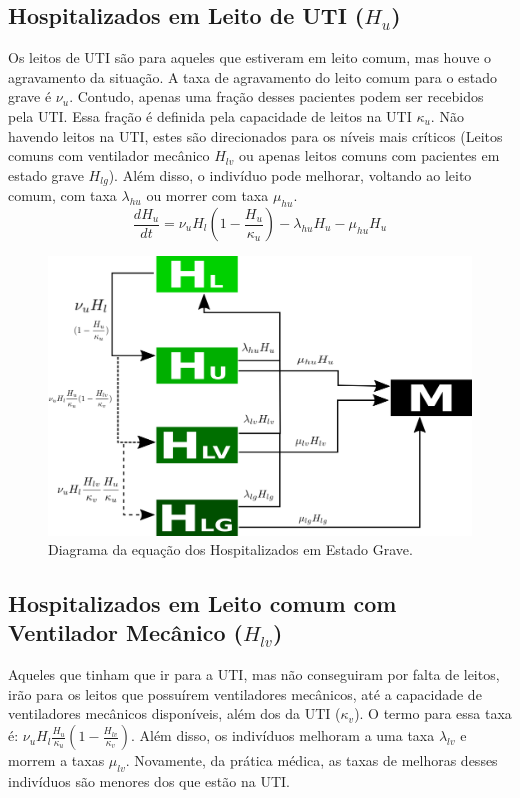 \documentclass[12pt,letterpaper]{article}
\begin{document}
\subsection{Hospitalizados em Leito de UTI ($H_u$)}
Os leitos de UTI são para aqueles que estiveram em leito comum, mas houve o agravamento da situação. A taxa de agravamento do leito comum para o estado grave é $\nu_u$. Contudo, apenas uma fração desses pacientes podem ser recebidos pela UTI. Essa fração é definida pela capacidade de leitos na UTI $\kappa_u$. Não havendo leitos na UTI, estes são direcionados para os níveis mais críticos (Leitos comuns com ventilador mecânico $H_{lv}$ ou apenas leitos comuns com pacientes em estado grave $H_{lg}$). Além disso, o indivíduo pode melhorar, voltando ao leito comum, com taxa $\lambda_{hu}$ ou morrer com taxa $\mu_{hu}$.
\begin{equation}
	\frac{dH_u}{dt}=\nu_u H_l(1 - \frac{H_u}{\kappa_{u}}) -\lambda_{hu} H_u -\mu_{hu} H_u
\end{equation}
\begin{figure}[!h]
	\centering
	\includegraphics[scale=0.4]{covidHu}
	\caption{Diagrama da equação dos Hospitalizados em Estado Grave.}
	\label{fig:universe}
\end{figure}


\subsection{Hospitalizados em Leito comum com Ventilador Mecânico ($H_{lv}$)}
Aqueles que tinham que ir para a UTI, mas não conseguiram por falta de leitos, irão para os leitos que possuírem ventiladores mecânicos, até a capacidade de ventiladores mecânicos disponíveis, além dos da UTI ($\kappa_v$). O termo para essa taxa é: $\nu_u H_l \frac{H_u}{\kappa_{u}}(1-\frac{H_{lv}}{\kappa_{v}})$. Além disso, os indivíduos melhoram a uma taxa $\lambda_{lv}$ e morrem a taxas $\mu_{lv}$. Novamente, da prática médica, as taxas de melhoras desses indivíduos são menores dos que estão na UTI.
\end{document}

